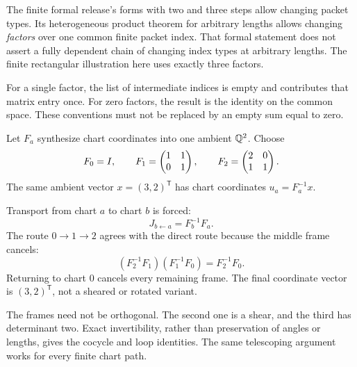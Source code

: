 The finite formal release's forms with two and three steps allow changing packet types. Its heterogeneous product theorem for arbitrary lengths allows changing \emph{factors} over one common finite packet index. That formal statement does not assert a fully dependent chain of changing index types at arbitrary lengths. The finite rectangular illustration here uses exactly three factors.

For a single factor, the list of intermediate indices is empty and contributes that matrix entry once. For zero factors, the result is the identity on the common space. These conventions must not be replaced by an empty sum equal to zero.


Let $F_a$ synthesize chart coordinates into one ambient $\mathbb Q^2$. Choose
\[
F_0=I,\qquad F_1=\begin{pmatrix}1&1\\0&1\end{pmatrix},\qquad
F_2=\begin{pmatrix}2&0\\1&1\end{pmatrix}.
\]
The same ambient vector $x=(3,2)^\mathsf T$ has chart coordinates $u_a=F_a^{-1}x$.


Transport from chart $a$ to chart $b$ is forced:
\[
J_{b\leftarrow a}=F_b^{-1}F_a.
\]
The route $0\to1\to2$ agrees with the direct route because the middle frame cancels:
\[
(F_2^{-1}F_1)(F_1^{-1}F_0)=F_2^{-1}F_0.
\]
Returning to chart $0$ cancels every remaining frame. The final coordinate vector is $(3,2)^\mathsf T$, not a sheared or rotated variant.

The frames need not be orthogonal. The second one is a shear, and the third has determinant two. Exact invertibility, rather than preservation of angles or lengths, gives the cocycle and loop identities. The same telescoping argument works for every finite chart path.


